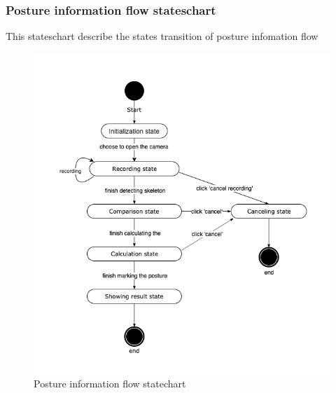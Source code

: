 \documentclass[16pt]{scrreprt}
\begin{document}
\subsubsection{Posture information flow stateschart}

This stateschart describe the states transition of posture infomation flow

\begin{figure}[H]
	\centering
	\includegraphics[width=1.0\textwidth]{figures/stateschart3.png}
	\caption{Posture information flow statechart}
\end{figure}
\end{document}

